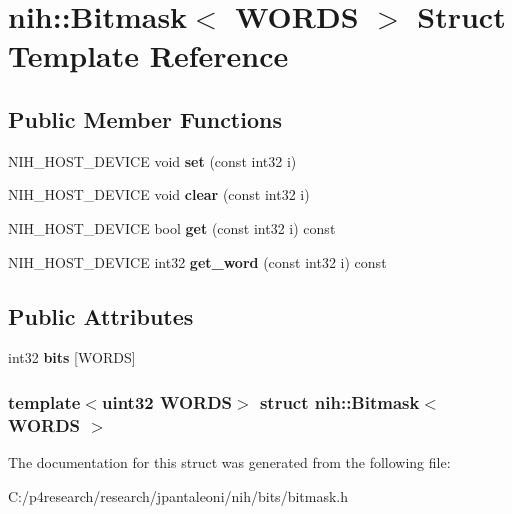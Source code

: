 \hypertarget{structnih_1_1_bitmask}{
\section{nih\-:\-:\-Bitmask$<$ \-W\-O\-R\-D\-S $>$ \-Struct \-Template \-Reference}
\label{structnih_1_1_bitmask}
}
\subsection*{\-Public \-Member \-Functions}
\begin{DoxyCompactItemize}
\item 
\hypertarget{structnih_1_1_bitmask_acacfdbb635fda2c7a5e8b28b8ca538bb}{
\-N\-I\-H\-\_\-\-H\-O\-S\-T\-\_\-\-D\-E\-V\-I\-C\-E void {\bfseries set} (const int32 i)}
\label{structnih_1_1_bitmask_acacfdbb635fda2c7a5e8b28b8ca538bb}

\item 
\hypertarget{structnih_1_1_bitmask_a33880c9c38980610739de2178c564f30}{
\-N\-I\-H\-\_\-\-H\-O\-S\-T\-\_\-\-D\-E\-V\-I\-C\-E void {\bfseries clear} (const int32 i)}
\label{structnih_1_1_bitmask_a33880c9c38980610739de2178c564f30}

\item 
\hypertarget{structnih_1_1_bitmask_a33253dbd0bc07e2cacc3693b9a29d8f1}{
\-N\-I\-H\-\_\-\-H\-O\-S\-T\-\_\-\-D\-E\-V\-I\-C\-E bool {\bfseries get} (const int32 i) const }
\label{structnih_1_1_bitmask_a33253dbd0bc07e2cacc3693b9a29d8f1}

\item 
\hypertarget{structnih_1_1_bitmask_a14fc25c06cf7b27c2e05d8c7b9af5113}{
\-N\-I\-H\-\_\-\-H\-O\-S\-T\-\_\-\-D\-E\-V\-I\-C\-E int32 {\bfseries get\-\_\-word} (const int32 i) const }
\label{structnih_1_1_bitmask_a14fc25c06cf7b27c2e05d8c7b9af5113}

\end{DoxyCompactItemize}
\subsection*{\-Public \-Attributes}
\begin{DoxyCompactItemize}
\item 
\hypertarget{structnih_1_1_bitmask_ac98bead7d7eb79b44c2bb049985aa883}{
int32 {\bfseries bits} \mbox{[}\-W\-O\-R\-D\-S\mbox{]}}
\label{structnih_1_1_bitmask_ac98bead7d7eb79b44c2bb049985aa883}

\end{DoxyCompactItemize}
\subsubsection*{template$<$uint32 \-W\-O\-R\-D\-S$>$ struct nih\-::\-Bitmask$<$ W\-O\-R\-D\-S $>$}



\-The documentation for this struct was generated from the following file\-:\begin{DoxyCompactItemize}
\item 
\-C\-:/p4research/research/jpantaleoni/nih/bits/bitmask.\-h\end{DoxyCompactItemize}

